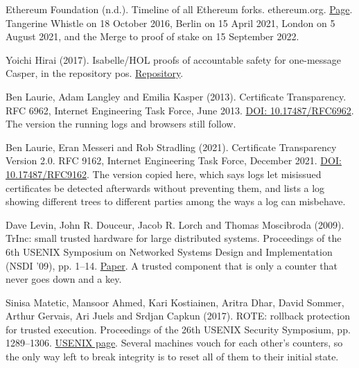 \noindent Ethereum Foundation (n.d.). Timeline of all Ethereum forks. ethereum.org. \href{https://ethereum.org/en/ethereum-forks/}{Page}. Tangerine Whistle on 18 October 2016, Berlin on 15 April 2021, London on 5 August 2021, and the Merge to proof of stake on 15 September 2022.
\par\medskip

\noindent Yoichi Hirai (2017). Isabelle/HOL proofs of accountable safety for one-message Casper, in the repository pos. \href{https://github.com/palmskog/pos}{Repository}.
\par\medskip

\noindent Ben Laurie, Adam Langley and Emilia Kasper (2013). Certificate Transparency. RFC 6962, Internet Engineering Task Force, June 2013. \href{https://doi.org/10.17487/RFC6962}{DOI: 10.17487/RFC6962}. The version the running logs and browsers still follow.
\par\medskip

\noindent Ben Laurie, Eran Messeri and Rob Stradling (2021). Certificate Transparency Version 2.0. RFC 9162, Internet Engineering Task Force, December 2021. \href{https://doi.org/10.17487/RFC9162}{DOI: 10.17487/RFC9162}. The version copied here, which says logs let misissued certificates be detected afterwards without preventing them, and lists a log showing different trees to different parties among the ways a log can misbehave.
\par\medskip

\noindent Dave Levin, John R. Douceur, Jacob R. Lorch and Thomas Moscibroda (2009). TrInc: small trusted hardware for large distributed systems. Proceedings of the 6th USENIX Symposium on Networked Systems Design and Implementation (NSDI '09), pp. 1--14. \href{https://www.usenix.org/legacy/event/nsdi09/tech/full_papers/levin/levin.pdf}{Paper}. A trusted component that is only a counter that never goes down and a key.
\par\medskip

\noindent Sinisa Matetic, Mansoor Ahmed, Kari Kostiainen, Aritra Dhar, David Sommer, Arthur Gervais, Ari Juels and Srdjan Capkun (2017). ROTE: rollback protection for trusted execution. Proceedings of the 26th USENIX Security Symposium, pp. 1289--1306. \href{https://www.usenix.org/conference/usenixsecurity17/technical-sessions/presentation/matetic}{USENIX page}. Several machines vouch for each other's counters, so the only way left to break integrity is to reset all of them to their initial state.
\par\medskip

